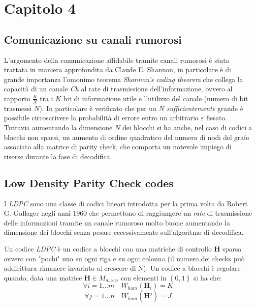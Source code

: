 \section{Capitolo 4}
	\subsection{Comunicazione su canali rumorosi}
	L'argomento della comunicazione affidabile tramite canali rumorosi è stata trattata in maniera approfondita da Claude E. Shannon, in particolare è di grande importanza l'omonimo teorema \textit{Shannon's coding theorem} che collega la capacità di un canale \textit{Ch} al rate di trasmissione dell'informazione, ovvero al rapporto $\frac{K}{N}$ tra i $K$ bit di informazione utile e l'utilizzo del canale (numero di bit trasmessi $N$). In particolare è verificato che per un $N$ \textit{sufficientemente} grande è possibile circoscrivere la probabilità di errore entro un arbitrario $\varepsilon$ fissato. Tuttavia aumentando la dimensione $N$ dei blocchi si ha anche, nel caso di codici a blocchi non sparsi, un aumento di ordine quadratico del numero di nodi del grafo associato alla matrice di parity check, che comporta un notevole impiego di risorse durante la fase di decodifica.
	\subsection {Low Density Parity Check codes}
	I \textit{LDPC} sono una classe di codici lineari introdotta per la prima volta da Robert G. Gallager negli anni 1960 che permettono di raggiungere un \textit{rate} di trasmissione delle informazioni tramite un canale rumoroso molto buone aumentando la dimensione dei blocchi senza pesare eccessivamente sull'algoritmo di decodifica.
	
	Un codice \textit{LDPC} è un codice a blocchi con una matriche di controllo $\textbf{H}$ sparsa ovvero con "pochi" uno su ogni riga e su ogni colonna (il numero dei checks può addirittura rimanere invariato al crescere di N). Un codice a blocchi è regolare quando, data una matrice $\textbf{H} \in M_{m \times n}$ con elementi in $\left\{0,1\right\}$ si ha che:
	\begin{equation}
		\forall i = 1 ... m \quad W_{ham}(\textbf{H}_i) = K
	\end{equation}
	\begin{equation}
		  \forall j =1 ... n \quad W_{ham}(\textbf{H}^j) = J 
	\end{equation}
	
